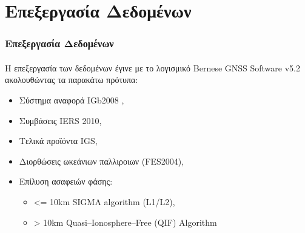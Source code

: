 \documentclass{beamer}
\begin{document}
\section{Επεξεργασία Δεδομένων}

\begin{frame}\frametitle{Επεξεργασία Δεδομένων}\framesubtitle{}
Η επεξεργασία των δεδομένων έγινε με το λογισμικό Bernese GNSS Software v5.2 \cite{bpe} ακολουθώντας τα παρακάτω πρότυπα:
\begin{itemize}
	\item Σύστημα αναφορά IGb2008 \cite{igb08},
	\item Συμβάσεις IERS 2010,
	\item Τελικά προϊόντα IGS,
	\item Διορθώσεις ωκεάνιων παλλιροιων (FES2004),
	\item Επίλυση ασαφειών φάσης:
	\begin{itemize}
		\item {<=} 10km SIGMA algorithm (L1/L2),
		\item {>}  10km Quasi–Ionosphere–Free (QIF) Algorithm
	\end{itemize}
% 
\end{itemize}
\end{frame}
\end{document}
